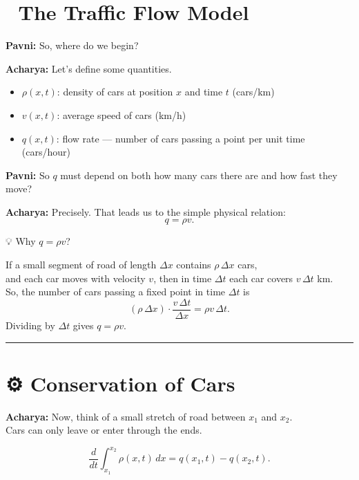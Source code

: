 \documentclass[
  letterpaper,
]{book}
\providecommand{\tightlist}{%
  \setlength{\itemsep}{0pt}\setlength{\parskip}{0pt}}
\begin{document}
\section{🚗 The Traffic Flow Model}\label{the-traffic-flow-model}

\textbf{Pavni:} So, where do we begin?

\textbf{Acharya:} Let's define some quantities.

\begin{itemize}
\tightlist
\item
  \(\rho(x,t)\): density of cars at position \(x\) and time \(t\)
  (cars/km)\\
\item
  \(v(x,t)\): average speed of cars (km/h)\\
\item
  \(q(x,t)\): flow rate --- number of cars passing a point per unit time
  (cars/hour)
\end{itemize}

\textbf{Pavni:} So \(q\) must depend on both how many cars there are and
how fast they move?

\textbf{Acharya:} Precisely. That leads us to the simple physical
relation: \[
q = \rho v.
\]

💡 Why \(q = \rho v\)?

If a small segment of road of length \(\Delta x\) contains
\(\rho \, \Delta x\) cars,\\
and each car moves with velocity \(v\), then in time \(\Delta t\) each
car covers \(v \, \Delta t\) km.\\
So, the number of cars passing a fixed point in time \(\Delta t\) is\\
\[
(\rho \, \Delta x) \cdot \frac{v \, \Delta t}{\Delta x} = \rho v \, \Delta t.
\] Dividing by \(\Delta t\) gives \(q = \rho v\).

\begin{center}\rule{0.5\linewidth}{0.5pt}\end{center}

\section{⚙️ Conservation of Cars}\label{conservation-of-cars}

\textbf{Acharya:} Now, think of a small stretch of road between \(x_1\)
and \(x_2\).\\
Cars can only leave or enter through the ends.

\[
\frac{d}{dt}\int_{x_1}^{x_2} \rho(x,t)\,dx = q(x_1,t) - q(x_2,t).
\]
\end{document}
